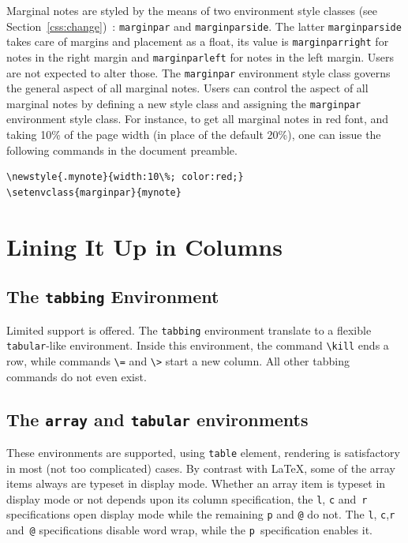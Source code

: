 Marginal notes are styled by the means of two environment style
classes (see Section~\ref{css:change})~:
\verb+marginpar+ and \verb+marginparside+.
The latter \verb+marginparside+ takes care of margins and placement as
a float, its value is \verb+marginparright+ for notes in the right
margin and \verb+marginparleft+ for notes in the left margin.
Users are not expected to alter those.
The \verb+marginpar+ environment style class governs the general
aspect of all marginal notes.
Users can control the aspect of all marginal notes by defining a new
style class and assigning the \verb+marginpar+ environment style
class.
For instance, to get all marginal notes in red font,
and taking 10\% of the page width (in place of the default
20\%),
one can issue the following commands in the document preamble.
\begin{verbatim}
\newstyle{.mynote}{width:10\%; color:red;}
\setenvclass{marginpar}{mynote}
\end{verbatim}


\section{Lining It Up in Columns}
\subsection{The \protect\texttt{tabbing} Environment}
Limited support is offered.
The \texttt{tabbing} environment translate to a flexible \texttt{tabular}-like
environment.
Inside this environment, the command \verb+\kill+ ends a row, while
commands
\verb+\=+ and \verb+\>+ start a new column.
All other tabbing commands do not even exist.

\subsection{The \texttt{array} and \texttt{tabular}
environments}\label{arraydef}

These environments are supported, using \html{}
\verb+table+ element, rendering is satisfactory in most (not too
complicated) cases.
By contrast with \LaTeX{},
some of the array items always are typeset in display mode.
Whether an array item is typeset in display mode or not depends upon
its column specification,
the \verb+l+, \verb+c+ and~\verb+r+ specifications open display mode
while the remaining \verb+p+ and \verb+@+ do not.
The \verb+l+, \verb+c+,\verb+r+ and~\verb+@+ specifications
disable word wrap, while the \verb+p+~specification enables it.

